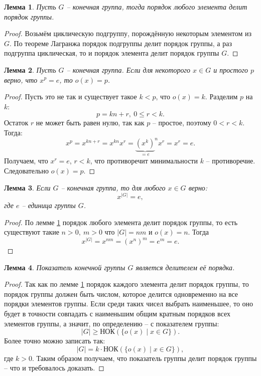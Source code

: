 \documentclass{article}
\newtheorem{lemma}{Лемма}[section]
\begin{document}
\begin{lemma} \label{nfi384}
    Пусть $G$ --  конечная группа, тогда порядок любого элемента делит порядок группы.
\end{lemma}
\begin{proof}
    Возьмём циклическую подгруппу, порождённую некоторым элементом из $G$. По теореме Лагранжа порядок подгруппы делит порядок группы, а раз подгруппа циклическая, то и порядок элемента делит порядок группы $G$.
\end{proof}

\begin{lemma}
    Пусть $G$ -- конечная группа. Если для некоторого $x \in G$ и простого $p$ верно, что $x^p = e$, то $o(x) = p$.
\end{lemma}
\begin{proof}
    Пусть это не так и существует такое $k < p$, что $o(x) = k$. Разделим $p$ на $k$: $$ p = kn + r, \ 0 \leqslant r < k. $$ Остаток $r$ не может быть равен нулю, так как $p$ -- простое, поэтому $0 < r < k$. Тогда: $$ x^p = x^{kn + r} = x^{kn} x^r = {\underbrace{(x^k)}_{=e}}^n x^r = x^r = e. $$ Получаем, что $x^r = e$, $r < k$, что противоречит минимальности $k$ -- противоречие. Следовательно $o(x) = p$.
\end{proof}

\begin{lemma} \label{fjoir}
        Если $G$ -- конечная группа, то для любого $x \in G$ верно: $$ x^{|G|} = e, $$ где $e$ -- единица группы $G$.
\end{lemma}
\begin{proof}
    По лемме \ref{nfi384} порядок любого элемента делит порядок группы, то есть существуют такие $n > 0, \ m > 0$ что $|G| = n m$ и $o(x) = n$. Тогда $$ x^{|G|} = x^{nm} = (x^n)^m = e^m = e. $$
\end{proof}

\begin{lemma}
    Показатель конечной группы $G$ является делителем её порядка.
\end{lemma}
\begin{proof}
    Так как по лемме \ref{nfi384} порядок каждого элемента делит порядок группы, то порядок группы должен быть числом, которое делится одновременно на все порядки элементов группы. Если среди таких чисел выбрать наименьшее, то оно будет в точности совпадать с наименьшим общим кратным порядков всех элементов группы, а значит, по определению -- с показателем группы: $$ |G| \geqslant \textrm{НОК}(\{o(x) \mid x \in G \}). $$
    Более точно можно записать так: $$ |G| = k \cdot \textrm{НОК}(\{o(x) \mid x \in G \}), $$ где $k > 0$. Таким образом получаем, что показатель группы делит порядок группы -- что и требовалось доказать.
\end{proof}
\end{document}
